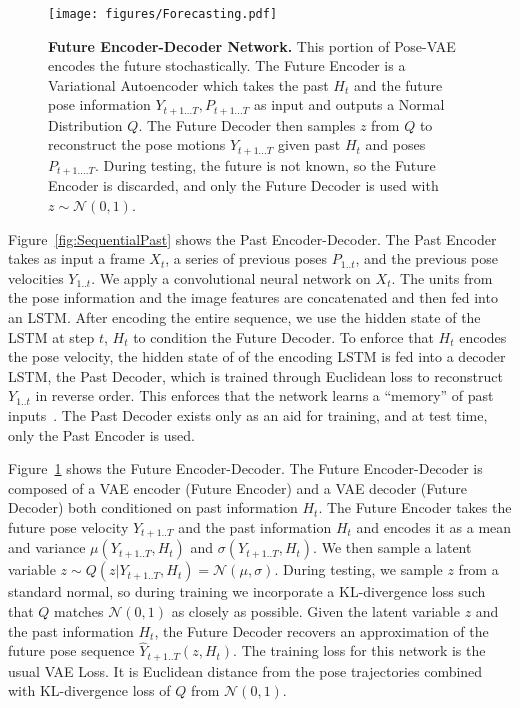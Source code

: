 \begin{figure}
\centering
\texttt{[image: figures/Forecasting.pdf]} 
\caption{{\bf Future Encoder-Decoder Network.} This portion of Pose-VAE encodes the future stochastically. The Future Encoder is a Variational Autoencoder which takes the past $H_{t}$ and the future pose information $Y_{t+1...T}, P_{t+1...T}$ as input and outputs a Normal Distribution $Q$. The Future Decoder then samples $z$ from $Q$ to reconstruct the pose motions $Y_{t+1...T}$ given past $H_{t}$ and poses $P_{t+1....T}$. During testing, the future is not known, so the Future Encoder is discarded, and only the Future Decoder is used with $z \sim \mathcal{N}(0,1)$. }
\label{fig:SequentialFuture}
\end{figure}

 Figure~\ref{fig:SequentialPast} shows the Past Encoder-Decoder. The Past Encoder takes as input a frame $X_t$, a series of previous poses $P_{1..t}$, and the previous pose velocities $Y_{1..t}$. We apply a convolutional neural network on $X_t$. The units from the pose information and the image features are concatenated and then fed into an LSTM. After encoding the entire sequence, we use the hidden state of the LSTM at step $t$, $H_t$ to condition the Future Decoder. To enforce that $H_t$ encodes the pose velocity, the hidden state of of the encoding LSTM is fed into a decoder LSTM, the Past Decoder, which is trained through Euclidean loss to reconstruct $Y_{1..t}$ in reverse order. This enforces that the network learns a ``memory'' of past inputs~\cite{Srivastava15}. The Past Decoder exists only as an aid for training, and at test time, only the Past Encoder is used.

 Figure~\ref{fig:SequentialFuture} shows the Future Encoder-Decoder. The Future Encoder-Decoder is composed of a VAE encoder (Future Encoder) and a VAE decoder (Future Decoder) both conditioned on past information $H_{t}$. The Future Encoder takes the future pose velocity $Y_{t+1..T}$ and the past information $H_t$ and encodes it as a mean and variance $\mu(Y_{t+1..T}, H_t)$ and $\sigma(Y_{t+1..T}, H_t)$. We then sample a latent variable $z \sim Q(z|Y_{t+1..T}, H_t) = \mathcal{N}(\mu,\sigma)$. During testing, we 
sample $z$ from a standard normal, so during training we incorporate a KL-divergence loss such that $Q$ matches $\mathcal{N}(0,1)$ as closely as possible. Given the latent variable $z$ and the past information $H_t$, the Future Decoder recovers an approximation of the future pose sequence $\hat{Y}_{t+1..T}(z, H_t)$. The training loss for this network is the usual VAE Loss. It is Euclidean distance from the pose trajectories combined with KL-divergence loss of $Q$ from $\mathcal{N}(0,1)$.

